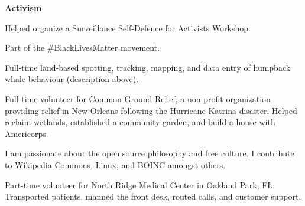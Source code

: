 \documentclass[a4paper,12pt]{article}
\newcommand{\resheading}[1]{{\vspace*{.06in} \colorbox{mygrey}{\begin{minipage}{\textwidth}{\textmd{\large \textbf{#1} \vphantom{p\^{E}}}}\end{minipage}}} }
\begin{document}
\resheading{Activism}
        \begin{description}\setlength{\itemsep}{0mm}
        \item[2015] Helped organize a Surveillance Self-Defence for Activists Workshop.
        \item[2014 $\rightarrow$ Present] Part of the \#BlackLivesMatter movement.
        \item[2012] Full-time land-based spotting, tracking, mapping, and data entry of humpback whale behaviour (\hyperlink{whalevolunteering}{description} above).
        \item[2008] Full-time volunteer for Common Ground Relief, a non-profit organization providing relief in New Orleans following the Hurricane Katrina disaster. Helped reclaim wetlands, established a community garden, and build a house with Americorps.
        \item[2006 $\rightarrow$ Present] I am passionate about the open source philosophy and free culture. I contribute to Wikipedia Commons, Linux, and BOINC amongst others. 
        \item[2006 $\rightarrow$ 2007] Part-time volunteer for North Ridge Medical Center in Oakland Park, FL.  Transported patients, manned the front desk, routed calls, and customer support.
        \end{description}
\end{document}
